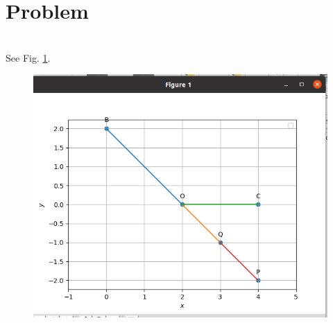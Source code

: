 \documentclass[10pt, a4paper]{article}
\begin{document}
\title{\mytitle}
\author{\myauthor\hspace{1em}\\\contact\\FWC22045\hspace{6.5em}IITH\hspace{0.5em}\mymodule\hspace{6em}Matrix:Lines}

\date{}
\maketitle


  \section{Problem}
  \fi
\\
\solution See Fig. 
		\ref{fig:11/10/1/10}.
	\begin{figure}[!ht]
		\centering
 \includegraphics[width=\columnwidth]{chapters/11/10/1/10/figs/fig.png}
		\caption{}
		\label{fig:11/10/1/10}
  	\end{figure}

	\iffalse
\end{document}
